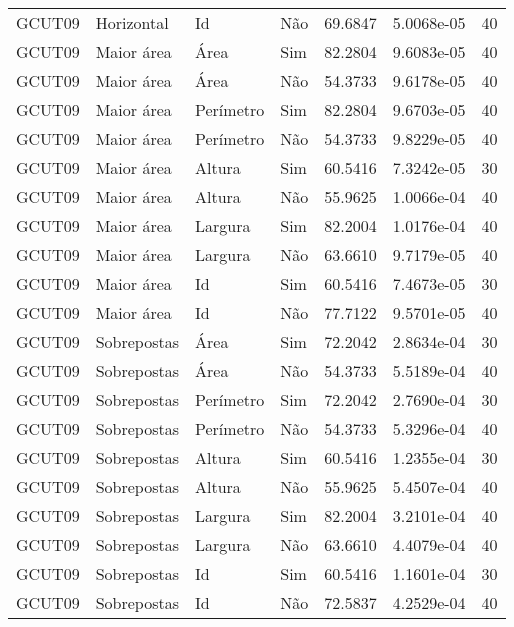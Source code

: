 \begin{tabular}{llllrrr}
GCUT09    & Horizontal  & Id        & Não         & 69.6847      & 5.0068e-05 & 40       \\
GCUT09    & Maior área  & Área      & Sim         & 82.2804      & 9.6083e-05 & 40       \\
GCUT09    & Maior área  & Área      & Não         & 54.3733      & 9.6178e-05 & 40       \\
GCUT09    & Maior área  & Perímetro & Sim         & 82.2804      & 9.6703e-05 & 40       \\
GCUT09    & Maior área  & Perímetro & Não         & 54.3733      & 9.8229e-05 & 40       \\
GCUT09    & Maior área  & Altura    & Sim         & 60.5416      & 7.3242e-05 & 30       \\
GCUT09    & Maior área  & Altura    & Não         & 55.9625      & 1.0066e-04 & 40       \\
GCUT09    & Maior área  & Largura   & Sim         & 82.2004      & 1.0176e-04 & 40       \\
GCUT09    & Maior área  & Largura   & Não         & 63.6610      & 9.7179e-05 & 40       \\
GCUT09    & Maior área  & Id        & Sim         & 60.5416      & 7.4673e-05 & 30       \\
GCUT09    & Maior área  & Id        & Não         & 77.7122      & 9.5701e-05 & 40       \\
GCUT09    & Sobrepostas & Área      & Sim         & 72.2042      & 2.8634e-04 & 30       \\
GCUT09    & Sobrepostas & Área      & Não         & 54.3733      & 5.5189e-04 & 40       \\
GCUT09    & Sobrepostas & Perímetro & Sim         & 72.2042      & 2.7690e-04 & 30       \\
GCUT09    & Sobrepostas & Perímetro & Não         & 54.3733      & 5.3296e-04 & 40       \\
GCUT09    & Sobrepostas & Altura    & Sim         & 60.5416      & 1.2355e-04 & 30       \\
GCUT09    & Sobrepostas & Altura    & Não         & 55.9625      & 5.4507e-04 & 40       \\
GCUT09    & Sobrepostas & Largura   & Sim         & 82.2004      & 3.2101e-04 & 40       \\
GCUT09    & Sobrepostas & Largura   & Não         & 63.6610      & 4.4079e-04 & 40       \\
GCUT09    & Sobrepostas & Id        & Sim         & 60.5416      & 1.1601e-04 & 30       \\
GCUT09    & Sobrepostas & Id        & Não         & 72.5837      & 4.2529e-04 & 40       \\
\hline
\end{tabular}